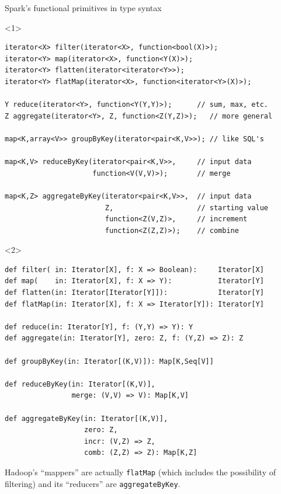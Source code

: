 \documentclass{beamer}
\begin{document}
\begin{frame}[fragile]{Spark's functional primitives in  type syntax}
\small
\begin{onlyenv}<1>
\begin{verbatim}
iterator<X> filter(iterator<X>, function<bool(X)>);
iterator<Y> map(iterator<X>, function<Y(X)>);
iterator<Y> flatten(iterator<iterator<Y>>);
iterator<Y> flatMap(iterator<X>, function<iterator<Y>(X)>);

Y reduce(iterator<Y>, function<Y(Y,Y)>);      // sum, max, etc.
Z aggregate(iterator<Y>, Z, function<Z(Y,Z)>);   // more general

map<K,array<V>> groupByKey(iterator<pair<K,V>>); // like SQL's

map<K,V> reduceByKey(iterator<pair<K,V>>,     // input data
                     function<V(V,V)>);       // merge

map<K,Z> aggregateByKey(iterator<pair<K,V>>,  // input data
                        Z,                    // starting value
                        function<Z(V,Z)>,     // increment
                        function<Z(Z,Z)>);    // combine
\end{verbatim}
\end{onlyenv}
\begin{onlyenv}<2>
\begin{verbatim}
def filter( in: Iterator[X], f: X => Boolean):     Iterator[X]
def map(    in: Iterator[X], f: X => Y):           Iterator[Y]
def flatten(in: Iterator[Iterator[Y]]):            Iterator[Y]
def flatMap(in: Iterator[X], f: X => Iterator[Y]): Iterator[Y]

def reduce(in: Iterator[Y], f: (Y,Y) => Y): Y
def aggregate(in: Iterator[Y], zero: Z, f: (Y,Z) => Z): Z

def groupByKey(in: Iterator[(K,V)]): Map[K,Seq[V]]

def reduceByKey(in: Iterator[(K,V)],
                merge: (V,V) => V): Map[K,V]

def aggregateByKey(in: Iterator[(K,V)],
                   zero: Z,
                   incr: (V,Z) => Z,
                   comb: (Z,Z) => Z): Map[K,Z]
\end{verbatim}
\end{onlyenv}

\normalsize
Hadoop's ``mappers'' are actually {\tt flatMap} (which includes the possibility of filtering) and its ``reducers'' are {\tt aggregateByKey}.
\end{frame}
\end{document}
